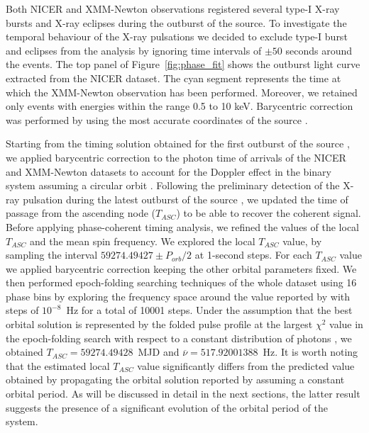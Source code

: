 \documentclass[fleqn,usenatbib]{mnras}
\newcommand{\nicer}{NICER}
\newcommand{\xmm}{XMM-Newton}
\begin{document}
Both NICER and XMM-Newton observations registered several type-I X-ray bursts and X-ray eclipses during the outburst of the source. To investigate the temporal behaviour of the X-ray pulsations we decided to exclude type-I burst and eclipses from the analysis by ignoring time intervals of $\pm 50$ seconds around the events. The top panel of Figure~\ref{fig:phase_fit} shows the outburst light curve extracted from the \nicer{} dataset. The cyan segment represents the time at which the \xmm{} observation has been performed. Moreover, we retained only events with energies within the range 0.5 to 10 keV. Barycentric correction was performed by using the most accurate coordinates of the source \citep{Jonker:2013wp}.

Starting from the timing solution obtained for the first outburst of the source \citep{Markwardt:2010tl}, we applied barycentric correction to the photon time of arrivals of the \nicer{} and \xmm{} datasets to account for the Doppler effect in the binary system assuming a circular orbit \citep[see e.g.,][for a detailed description of the method]{Burderi:2007tl,Sanna:2016ty}. Following the preliminary detection of the X-ray pulsation during the latest outburst of the source \citep{Bult:2021wk}, we updated the time of passage from the ascending node ($T_{ASC}$) to be able to recover the coherent signal. Before applying phase-coherent timing analysis, we refined the values of the local $T_{ASC}$ and the mean spin frequency. We explored the local $T_{ASC}$ value, by sampling the interval $59274.49427\pm P_{orb}/2$ at 1-second steps. For each $T_{ASC}$ value we applied barycentric correction keeping the other orbital parameters fixed. We then performed epoch-folding searching techniques of the whole dataset using 16 phase bins by exploring the frequency space around the value reported by \citet{Bult:2021wk} with steps of $10^{-8}$~Hz for a total of 10001 steps. Under the assumption that the best orbital solution is represented by the folded pulse profile at the largest $\chi^2$ value in the epoch-folding search with respect to a constant distribution of photons \citep[see
e.g.,][]{Kirsch:2004tg}, we obtained $T_{ASC}=59274.49428$~MJD and $\overline{\nu}=517.92001388$~Hz.
It is worth noting that the estimated local $T_{ASC}$ value significantly differs from the predicted value obtained by propagating the orbital solution reported by \citep{Markwardt:2010tl} assuming a constant orbital period. As will be discussed in detail in the next sections, the latter result suggests the presence of a significant evolution of the orbital period of the system.
\end{document}
